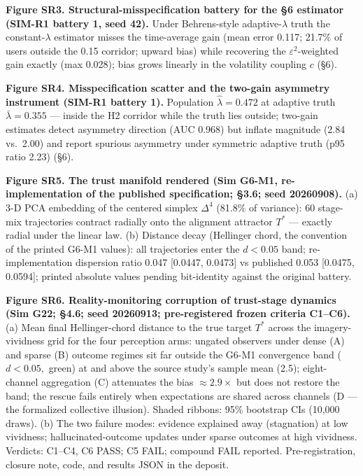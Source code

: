 \documentclass[11pt,twocolumn]{article}
\theoremstyle{gttdef}
\theoremstyle{gttplain}
\begin{document}
\textbf{Figure SR3. Structural-misspecification battery for the \S{}6 estimator (SIM-R1 battery 1, seed 42).} Under Behrens-style adaptive-$\lambda$ truth the constant-$\lambda$ estimator misses the time-average gain (mean error 0.117; 21.7\% of users outside the 0.15 corridor; upward bias) while recovering the $\varepsilon^{2}$-weighted gain exactly (max 0.028); bias grows linearly in the volatility coupling $c$ (\S{}6).

\textbf{Figure SR4. Misspecification scatter and the two-gain asymmetry instrument (SIM-R1 battery 1).} Population $\hat{\lambda} = 0.472$ at adaptive truth $\bar{\lambda} = 0.355$ --- inside the H2 corridor while the truth lies outside; two-gain estimates detect asymmetry direction (AUC 0.968) but inflate magnitude (2.84 vs.\ 2.00) and report spurious asymmetry under symmetric adaptive truth (p95 ratio 2.23) (\S{}6).

\textbf{Figure SR5. The trust manifold rendered (Sim G6-M1, re-implementation of the published specification; \S{}3.6; seed 20260908).} (a) 3-D PCA embedding of the centered simplex $\Delta^{4}$ (81.8\% of variance): 60 stage-mix trajectories contract radially onto the alignment attractor $T^{*}$ --- exactly radial under the linear law. (b) Distance decay (Hellinger chord, the convention of the printed G6-M1 values): all trajectories enter the $d < 0.05$ band; re-implementation dispersion ratio 0.047 [0.0447, 0.0473] vs published 0.053 [0.0475, 0.0594]; printed absolute values pending bit-identity against the original battery.

\textbf{Figure SR6. Reality-monitoring corruption of trust-stage dynamics (Sim G22; \S{}4.6; seed 20260913; pre-registered frozen criteria C1--C6).} (a) Mean final Hellinger-chord distance to the true target $T^{*}$ across the imagery-vividness grid for the four perception arms: ungated observers under dense (A) and sparse (B) outcome regimes sit far outside the G6-M1 convergence band ($d < 0.05,$ green) at and above the source study's sample mean (2.5); eight-channel aggregation (C) attenuates the bias $\approx$$2.9\times$ but does not restore the band; the rescue fails entirely when expectations are shared across channels (D --- the formalized collective illusion). Shaded ribbons: 95\% bootstrap CIs (10,000 draws). (b) The two failure modes: evidence explained away (stagnation) at low vividness; hallucinated-outcome updates under sparse outcomes at high vividness. Verdicts: C1--C4, C6 PASS; C5 FAIL; compound FAIL reported. Pre-registration, closure note, code, and results JSON in the deposit.
\end{document}
